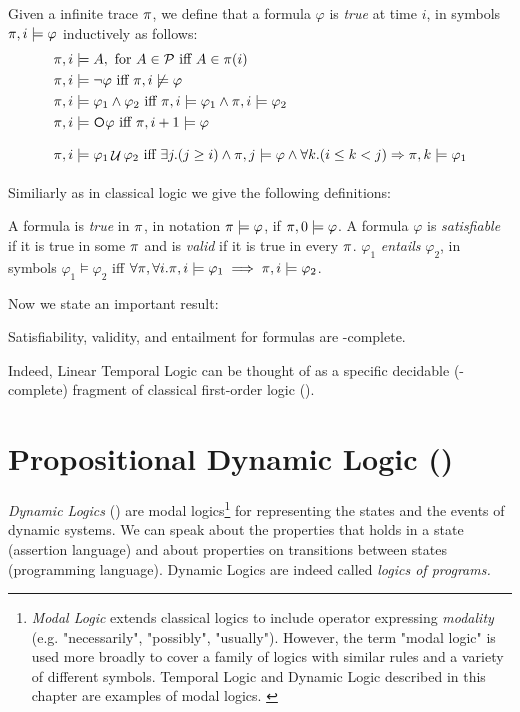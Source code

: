 \begin{definition}\label{ltl-satisfaction}
	Given a infinite trace $\pi$, we define that a \LTL formula $\varphi$ is \emph{true} at time $i$, in symbols $\pi, i \models \varphi$ inductively as follows:
	\begin{align*}
		\trace, i &\models A, \tm{for} A\in\Prop \tiff A \in \trace(i)\\
		\trace, i &\models \lnot \varphi \tiff \trace, i \not\models \varphi\\
		\trace, i &\models \varphi_1 \lAND \varphi_2 \tiff \trace, i \models \varphi_1 \lAND \trace, i \models \varphi_2\\
		\trace, i &\models \Next\varphi \tiff \trace,i+1 \models \varphi\\
		\trace, i &\models \varphi_1 \lUntil \varphi_2 \tiff \exists j. (j\ge i) \lAND \trace,j \models \varphi \lAND\forall k. (i\le k < j) \Rightarrow \trace, k \models \varphi_1\\
	\end{align*}
\end{definition}
Similiarly as in classical logic we give the following definitions:
\begin{definition}\label{ltl-sat-val-ent}
A \LTL formula is \emph{true} in $\pi$, in notation $\pi \models \varphi$, if $\pi, 0 \models \varphi$. A formula $\varphi$ is \emph{satisfiable} if it is true in some $\pi$ and is \emph{valid} if it is true in every $\pi$. $\varphi_1$ \emph{entails} $\varphi_2$, in symbols $\varphi_1 \models \varphi_2$ iff $\forall \pi, \forall i.\pi, i \models \varphi_1 \implies \pi, i \models \varphi_2$.
\end{definition}

Now we state an important result:
\begin{theorem}
	Satisfiability, validity, and entailment for \LTL formulas are \PSPACE-complete.
\end{theorem}
Indeed, Linear Temporal Logic can be thought of as a specific decidable (\PSPACE-complete) fragment of classical first-order logic (\FOL).
\section{Propositional Dynamic Logic (\PDL)}\label{pdl}
\emph{Dynamic Logics} \citep{Pratt:1976:SCF:889769, sep-logic-dynamic} (\DL) are modal logics\footnote{\emph{Modal Logic} extends classical logics to include operator  expressing \emph{modality} (e.g. "necessarily", "possibly", "usually"). However, the term "modal logic" is used more broadly to cover a family of logics with similar rules and a variety of different symbols. Temporal Logic and Dynamic Logic described in this chapter are examples of modal logics. \citep{sep-logic-modal}}
for representing the states and the events of dynamic systems. We can speak about the properties that holds in a state (assertion language) and about properties on transitions between states (programming language). Dynamic Logics are indeed called \emph{logics of programs.}

